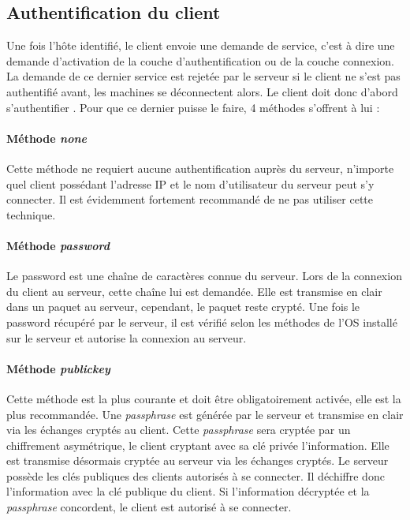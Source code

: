 \subsection{Authentification du client}

Une fois l'hôte identifié, le client envoie une demande de service, c'est à dire une demande d'activation de la couche d'authentification ou de la couche connexion. La demande de ce dernier service est rejetée par le serveur si le client ne s'est pas authentifié avant, les machines se déconnectent alors. Le client doit donc d'abord s'authentifier \cite{hajjeh_ibrahim_protocole_2006}. Pour que ce dernier puisse le faire, 4 méthodes s'offrent à lui :

\paragraph{Méthode \textit{none}}
Cette méthode ne requiert aucune authentification auprès du serveur, n'importe quel client possédant l'adresse IP et le nom d'utilisateur du serveur peut s'y connecter. Il est évidemment fortement recommandé de ne pas utiliser cette technique.\cite{lonvick_secure_2006}

\paragraph{Méthode \textit{password}}
Le password est une chaîne de caractères connue du serveur. Lors de la connexion du client au serveur, cette chaîne lui est demandée. Elle est transmise en clair dans un paquet au serveur, cependant, le paquet reste crypté. Une fois le password récupéré par le serveur, il est vérifié selon les méthodes de l'OS installé sur le serveur et autorise la connexion au serveur.\cite{lonvick_secure_2006}

\paragraph{Méthode \textit{publickey}}
Cette méthode est la plus courante et doit être obligatoirement activée, elle est la plus recommandée. Une \textit{passphrase} est générée par le serveur et transmise en clair via les échanges cryptés au client. Cette \textit{passphrase} sera cryptée par un chiffrement asymétrique, le client cryptant avec sa clé privée l'information. Elle est transmise désormais cryptée au serveur via les échanges cryptés. Le serveur possède les clés publiques des clients autorisés à se connecter. Il déchiffre donc l'information avec la clé publique du client. Si l'information décryptée et la \textit{passphrase} concordent, le client est autorisé à se connecter. \cite{lonvick_secure_2006}

